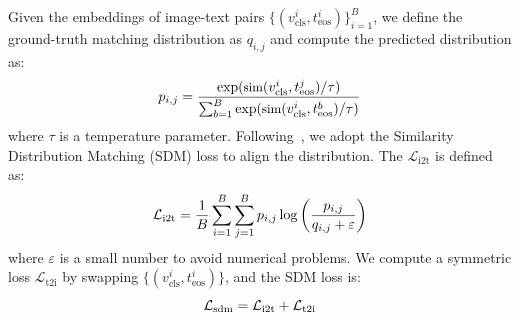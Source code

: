 Given the embeddings of image-text pairs $\{(v_{\text{cls}}^i, t^i_{\text{eos}})\}_{i=1}^{B} $, we define the ground-truth matching distribution as $q_{i,j}$ and compute the predicted distribution as:
\begin{equation}
\small
p_{i,j} = \frac{\exp(\text{sim}(v^i_{\text{cls}}, t^j_{\text{eos}})/\tau)}{\sum_{b=1}^{B} \exp(\text{sim}(v^i_{\text{cls}}, t^b_{\text{eos}})/\tau)}
\end{equation}
where $\tau$ is a temperature parameter. Following~\cite{jiang2023cross}, we adopt the Similarity Distribution Matching (SDM) loss to align the distribution.
The $\mathcal{L}_{\text{i2t}}$ is defined as:
\begin{equation}
\small
\mathcal{L}_{\text{i2t}} = \frac{1}{B} \sum_{i=1}^{B} \sum_{j=1}^{B} p_{i,j} \log \left( \frac{p_{i,j}}{q_{i,j} + \varepsilon} \right)
\end{equation}
where $\varepsilon$ is a small number to avoid numerical problems. We compute a symmetric loss $ \mathcal{L}_{\text{t2i}} $ by swapping $\{(v_{\text{cls}}^i, t^i_{\text{eos}})\}$, and the SDM loss is:
\begin{equation}
\small
\mathcal{L}_{\text{sdm}} = \mathcal{L}_{\text{i2t}} + \mathcal{L}_{\text{t2i}}
\end{equation}



